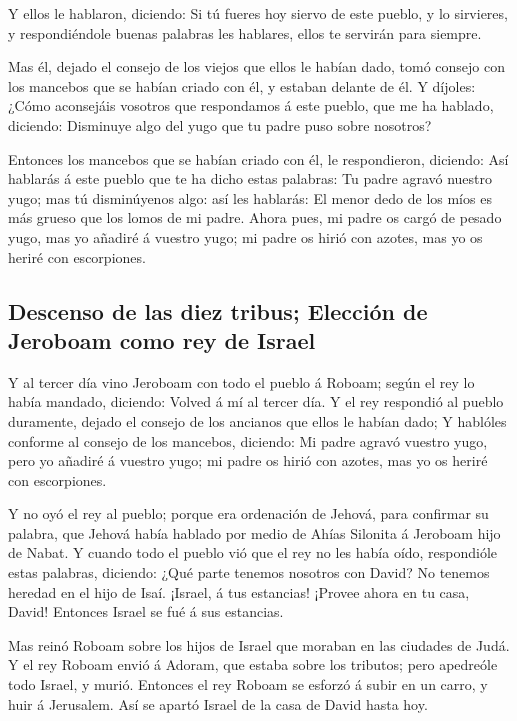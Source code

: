  Y ellos le hablaron, diciendo: Si tú fueres hoy siervo de
este pueblo, y lo sirvieres, y respondiéndole buenas palabras les
hablares, ellos te servirán para siempre.

 Mas él, dejado el consejo de los viejos que ellos le habían
dado, tomó consejo con los mancebos que se habían criado con él, y
estaban delante de él.  Y díjoles: ¿Cómo aconsejáis vosotros
que respondamos á este pueblo, que me ha hablado, diciendo: Disminuye
algo del yugo que tu padre puso sobre nosotros?

 Entonces los mancebos que se habían criado con él, le
respondieron, diciendo: Así hablarás á este pueblo que te ha dicho estas
palabras: Tu padre agravó nuestro yugo; mas tú disminúyenos algo: así
les hablarás: El menor dedo de los míos es más grueso que los lomos de
mi padre.  Ahora pues, mi padre os cargó de pesado yugo,
mas yo añadiré á vuestro yugo; mi padre os hirió con azotes, mas yo os
heriré con escorpiones.

\hypertarget{descenso-de-las-diez-tribus-elecciuxf3n-de-jeroboam-como-rey-de-israel}{%
\subsection{Descenso de las diez tribus; Elección de Jeroboam como rey
de
Israel}\label{descenso-de-las-diez-tribus-elecciuxf3n-de-jeroboam-como-rey-de-israel}}

 Y al tercer día vino Jeroboam con todo el pueblo á Roboam;
según el rey lo había mandado, diciendo: Volved á mí al tercer día.
 Y el rey respondió al pueblo duramente, dejado el consejo
de los ancianos que ellos le habían dado;  Y hablóles
conforme al consejo de los mancebos, diciendo: Mi padre agravó vuestro
yugo, pero yo añadiré á vuestro yugo; mi padre os hirió con azotes, mas
yo os heriré con escorpiones.

 Y no oyó el rey al pueblo; porque era ordenación de
Jehová, para confirmar su palabra, que Jehová había hablado por medio de
Ahías Silonita á Jeroboam hijo de Nabat.  Y cuando todo el
pueblo vió que el rey no les había oído, respondióle estas palabras,
diciendo: ¿Qué parte tenemos nosotros con David? No tenemos heredad en
el hijo de Isaí. ¡Israel, á tus estancias! ¡Provee ahora en tu casa,
David! Entonces Israel se fué á sus estancias.

 Mas reinó Roboam sobre los hijos de Israel que moraban en
las ciudades de Judá.  Y el rey Roboam envió á Adoram, que
estaba sobre los tributos; pero apedreóle todo Israel, y murió. Entonces
el rey Roboam se esforzó á subir en un carro, y huir á Jerusalem.
 Así se apartó Israel de la casa de David hasta hoy.

